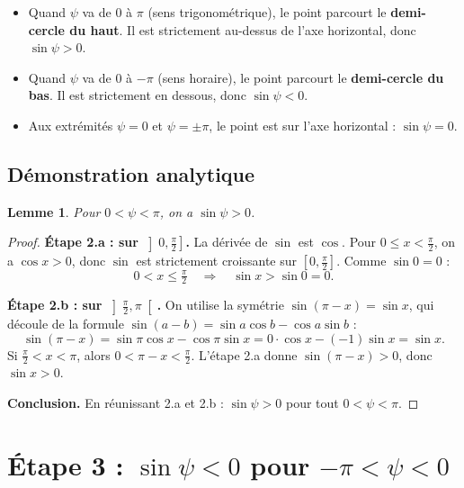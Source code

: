 \documentclass[11pt,a4paper]{article}
\numberwithin{equation}{section}
\theoremstyle{plain}
\newtheorem{lemme}[proposition]{Lemme}
\theoremstyle{definition}
\begin{document}
\begin{itemize}
  \item Quand $\psi$ va de $0$ à $\pi$ (sens trigonométrique), le point parcourt le \textbf{demi-cercle du haut}.
        Il est strictement au-dessus de l'axe horizontal, donc $\sin\psi>0$.
  \item Quand $\psi$ va de $0$ à $-\pi$ (sens horaire), le point parcourt le \textbf{demi-cercle du bas}.
        Il est strictement en dessous, donc $\sin\psi<0$.
  \item Aux extrémités $\psi=0$ et $\psi=\pm\pi$, le point est sur l'axe horizontal : $\sin\psi=0$.
\end{itemize}

\subsection{Démonstration analytique}

\begin{lemme}\label{lem:sinpos}
Pour $0<\psi<\pi$, on a $\sin\psi>0$.
\end{lemme}
\begin{proof}
\textbf{Étape 2.a : sur $\left]0,\frac{\pi}{2}\right]$.}
La dérivée de $\sin$ est $\cos$. Pour $0\le x<\frac\pi2$, on a $\cos x>0$, donc $\sin$ est strictement
croissante sur $\left[0,\frac\pi2\right]$. Comme $\sin 0 = 0$ :
\begin{equation}
0<x\le\tfrac{\pi}{2}\quad\Longrightarrow\quad \sin x>\sin 0 = 0 .
\end{equation}

\textbf{Étape 2.b : sur $\left]\frac{\pi}{2},\pi\right[$.}
On utilise la symétrie $\sin(\pi-x) = \sin x$, qui découle de la formule
$\sin(a-b)=\sin a\cos b-\cos a\sin b$ :
\begin{equation}
\sin(\pi-x) = \sin\pi\cos x - \cos\pi\sin x = 0\cdot\cos x-(-1)\sin x = \sin x .
\end{equation}
Si $\frac\pi2<x<\pi$, alors $0<\pi-x<\frac\pi2$. L'étape 2.a donne $\sin(\pi-x)>0$, donc $\sin x>0$.

\textbf{Conclusion.} En réunissant 2.a et 2.b : $\sin\psi>0$ pour tout $0<\psi<\pi$.
\end{proof}

\section{Étape 3 : $\sin\psi<0$ pour $-\pi<\psi<0$}
\end{document}

